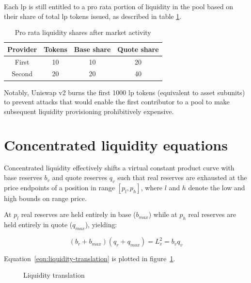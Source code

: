 \documentclass[table, twocolumn]{article}
\begin{document}
Each \gls{lp} is still entitled to a pro rata portion of liquidity in the pool based on
their share of total \gls{lp} tokens issued, as described in table
\ref{tab:lp-pro-rata-shares}.

\begin{table}[!htb]
  \centering
  \begin{tabular}{|c|c|c|c|}
    \hline \rowcolor{blue}
    Provider & Tokens & Base share & Quote share \\ \hline
    First    & 10     & 10         & 20          \\ \hline
    Second   & 20     & 20         & 40          \\ \hline
  \end{tabular}
  \caption{Pro rata liquidity shares after market activity}
  \label{tab:lp-pro-rata-shares}
\end{table}

Notably, Uniswap v2 burns the first 1000 \gls{lp} tokens (equivalent to asset subunits)
to prevent attacks that would enable the first contributor to a pool to make subsequent
liquidity provisioning prohibitively expensive.

\section{Concentrated liquidity equations}

Concentrated liquidity effectively shifts a virtual constant product curve with base
reserves $b_v$ and quote reserves $q_v$ such that real reserves are exhausted at the
price endpoints of a position in range $[p_l, p_h]$, where $l$ and $h$ denote the low
and high bounds on range price.

At $p_l$ real reserves are held entirely in base ($b_{max}$) while at $p_h$ real
reserves are held entirely in quote ($q_{max}$), yielding:

\begin{equation} \label{eqn:liquidity-translation}
  (b_r + b_{max})(q_r + q_{max}) = L_v^2 = b_v q_v
\end{equation}

Equation~\ref{eqn:liquidity-translation} is plotted in
figure~\ref{fig:liquidity-translation}.

\begin{figure}[!htb]
  \centering
  
  \caption{Liquidity translation}
  \label{fig:liquidity-translation}
\end{figure}
\end{document}
